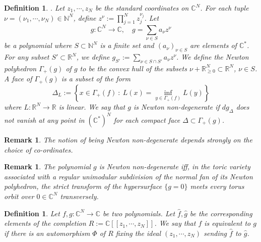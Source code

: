 \documentclass[11pt]{amsart}
\newtheorem{defn}[thm]{Definition}
\newtheorem{remark}[thm]{Remark}
\newcommand{\bR}{\mathbb{R}}
\newcommand{\bC}{\mathbb{C}}
\newcommand{\bN}{\mathbb{N}}
\numberwithin{equation}{section}
\renewcommand{\geq}{\geqslant}
\newcommand{\C}{\mathbb C}
\begin{document}
\begin{defn} \label{defnnewtonnondegenerate} \cite[Sections 6.2.1 and 6.2.2]{arnold2012singularities}.
	Let $z_1,\cdots,z_N$ be the standard coordinates on $\bC^N$.
	For each tuple $\nu = (\nu_1,\cdots,\nu_N) \in \bN^N$, define $z^\nu := \prod_{j=1}^N z_j^{\nu_j}$.
	Let
	\begin{equation}
		g : \C^N \to \C, \quad g = \sum_{\nu \in S} a_\nu z^\nu
	\end{equation}
	be a polynomial where $S \subset \bN^N$ is a finite set and $(a_\nu)_{\nu \in S}$ are elements of $\bC^*$.
	For any subset $S' \subset \bR^N$, we define $g_{S'} := \sum_{\nu \in S \cap S'} a_\nu z^\nu$.
	We define the \emph{Newton polyhedron $\Gamma_+(g)$ of $g$} to be the convex hull of the subsets $\nu + \bR_{\geq 0}^N \subset \bR^N$, $\nu \in S$.
	A \emph{face} of $\Gamma_+(g)$ is a subset of the form \begin{equation}
		\Delta_L := \left\{x \in \Gamma_+(f) \ : \ L(x) = \inf_{y \in \Gamma_+(f)} L(y) \right\}
	\end{equation}
	where $L : \bR^N \to \bR$ is linear.
	We say that $g$ is \emph{Newton non-degenerate}
	if $dg_\Delta$ does not vanish at any point in $(\bC^*)^N$ for each compact face $\Delta \subset \Gamma_+(g)$.
\end{defn}

\begin{remark}
	The notion of being Newton non-degenerate depends strongly on the choice of co-ordinates.
\end{remark}

\begin{remark}
	The polynomial $g$ is Newton non-degenerate iff, in the toric variety associated with a regular unimodular subdivision of the normal fan of its Newton polyhedron, the strict transform of the hypersurface $\{g=0\}$ meets every torus orbit over $0 \in \bC^N$ transversely.
\end{remark}

\begin{defn} \label{defnequivalence}
	Let $f, g : \C^N \to \C$ be two polynomials.
	Let $\widehat{f}, \widehat{g}$ be the corresponding elements of the completion $R := \C[[z_1,\cdots,z_N]]$.
	We say that $f$ is \emph{equivalent} to $g$ if there is an automorphism $\Phi$ of $R$ fixing the ideal $(z_1,\cdots,z_N)$ sending $\widehat{f}$ to $\widehat{g}$.
\end{defn}
\end{document}

